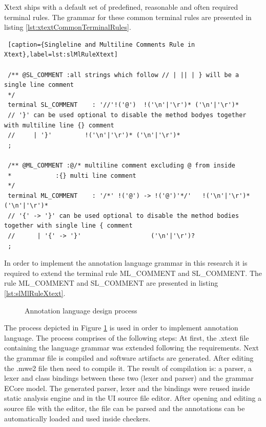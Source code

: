 Xtext ships with a default set of predefined, reasonable and often required terminal rules. The grammar for these common terminal rules are presented in listing \ref{lst:xtextCommonTerminalRules}.

 \lipsum[1-3]
 \begin{lstlisting} [caption={Singleline and Multiline Comments Rule in Xtext},label=lst:slMlRuleXtext]

 /** @SL_COMMENT :all strings which follow // | || | } will be a single line comment
 */ 
 terminal SL_COMMENT 	: '//'!('@')  !('\n'|'\r')* ('\n'|'\r')*
 // '}' can be used optional to disable the method bodyes together with multiline line {} comment 
 //     | '}'         !('\n'|'\r')* ('\n'|'\r')*               
 ;	

 /** @ML_COMMENT :@/* multiline comment excluding @ from inside
 *            :{} multi line comment 
 */ 
 terminal ML_COMMENT	: '/*' !('@') -> !('@')'*/'   !('\n'|'\r')* ('\n'|'\r')*   
 // '{' -> '}' can be used optional to disable the method bodies together with single line { comment 
 //      | '{' -> '}'                   ('\n'|'\r')?
 ;   
 \end{lstlisting}

In order to implement the annotation language grammar in this research it is required to extend the terminal rule ML\_COMMENT and SL\_COMMENT. The  rule ML\_COMMENT and SL\_COMMENT are presented in listing \ref{lst:slMlRuleXtext}.
 

\begin{figure}[H]
	\centering
	\caption{Annotation language design process}
	\label{figure:Language_Design_Process}
\end{figure}


The process depicted in Figure \ref{figure:Language_Design_Process} is used in order to
implement annotation language. The process comprises of the following steps: At first, the .xtext file
containing the language grammar was extended following the requirements. Next the grammar file is compiled and software artifacts are generated. After editing the .mwe2 file then need to compile it. The result of compilation is: a parser, a lexer and class bindings between these two (lexer and parser) and the grammar ECore model. The generated parser, lexer and the bindings were reused inside static analysis engine and in the UI source file editor. After opening and editing a source file with the editor, the file can be parsed and the annotations can be automatically loaded and used inside checkers.
